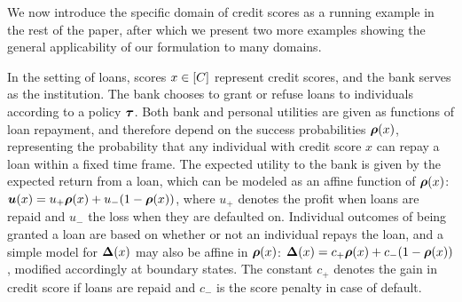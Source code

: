 We now introduce the specific domain of credit scores as a running example in the rest of the paper, after which we present two more examples showing the general applicability of our formulation to many domains. 


\begin{exmp} 
	\label{ex:credit_lending} In the setting of loans, scores $x \in [C]$ represent credit scores, and the bank serves as the institution. The bank chooses to grant or refuse loans to individuals according to a policy $\boldsymbol{\tau}$. Both bank and personal utilities are given as functions of loan repayment, and therefore depend on the success probabilities $\boldsymbol{\rho}(x)$, representing the probability that any individual with credit score $x$ can repay a loan within a fixed time frame. The expected utility to the bank is given by the expected return from a loan, which can be modeled as an affine function of $\boldsymbol{\rho}(x)$: $\boldsymbol{u}(x) = u_+\boldsymbol{\rho}(x) + u_-(1-\boldsymbol{\rho}(x))$, where $u_+$ denotes the profit when loans are repaid and $u_-$ the loss when they are defaulted on. Individual outcomes of being granted a loan are based on whether or not an individual repays the loan, and a simple model for $\boldsymbol{\Delta}(x)$ may also be affine in $\boldsymbol{\rho}(x)$: $\boldsymbol{\Delta}(x) = c_+ \boldsymbol{\rho}(x) + c_- (1 - \boldsymbol{\rho}(x))$, modified accordingly at boundary states. The constant $c_+$ denotes the gain in credit score if loans are repaid and $c_-$ is the score penalty in case of default.
	
	
	
\end{exmp}


